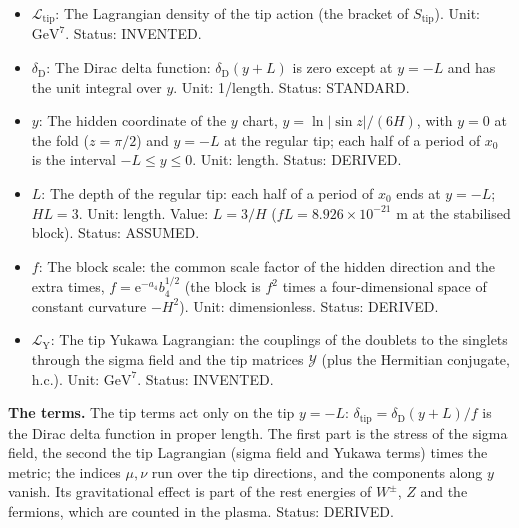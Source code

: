 \documentclass[
  10pt,
]{article}
\begin{document}
\begin{itemize}
  \(g_{MN}\,\mathrm{d}X^M\mathrm{d}X^N\) is the squared interval;
  \(g^{MN}\) is its inverse, \(g^M{}_N = \delta^M_N\), and
  \(\lvert g\rvert\) the absolute value of its determinant, so that
  \(\sqrt{\lvert g\rvert}\,\mathrm{d}^8X\) is the proper volume element.
  Unit: dimensionless. Status: AUTHOR.
\item
  \(\mathcal{L}_{\mathrm{tip}}\): The Lagrangian density of the tip
  action (the bracket of \(S_{\mathrm{tip}}\)). Unit:
  \(\mathrm{GeV}^{7}\). Status: INVENTED.
\item
  \(\delta_{\mathrm{D}}\): The Dirac delta function:
  \(\delta_{\mathrm{D}}(y + L)\) is zero except at \(y = -L\) and has
  the unit integral over \(y\). Unit: 1/length. Status: STANDARD.
\item
  \(y\): The hidden coordinate of the \(y\) chart,
  \(y = \ln\lvert\sin z\rvert/(6H)\), with \(y = 0\) at the fold
  (\(z = \pi/2\)) and \(y = -L\) at the regular tip; each half of a
  period of \(x_0\) is the interval \(-L \le y \le 0\). Unit: length.
  Status: DERIVED.
\item
  \(L\): The depth of the regular tip: each half of a period of \(x_0\)
  ends at \(y = -L\); \(HL = 3\). Unit: length. Value: \(L = 3/H\)
  (\(fL = 8.926\times10^{-21}\) m at the stabilised block). Status:
  ASSUMED.
\item
  \(f\): The block scale: the common scale factor of the hidden
  direction and the extra times, \(f = \mathrm{e}^{-a_4}b_4^{1/2}\) (the
  block is \(f^2\) times a four-dimensional space of constant curvature
  \(-H^2\)). Unit: dimensionless. Status: DERIVED.
\item
  \(\mathcal{L}_{\mathrm{Y}}\): The tip Yukawa Lagrangian: the couplings
  of the doublets to the singlets through the sigma field and the tip
  matrices \(\mathcal{Y}\) (plus the Hermitian conjugate, h.c.). Unit:
  \(\mathrm{GeV}^{7}\). Status: INVENTED.
\end{itemize}

\textbf{The terms.} The tip terms act only on the tip \(y = -L\):
\(\delta_{\mathrm{tip}} = \delta_{\mathrm{D}}(y + L)/f\) is the Dirac
delta function in proper length. The first part is the stress of the
sigma field, the second the tip Lagrangian (sigma field and Yukawa
terms) times the metric; the indices \(\mu, \nu\) run over the tip
directions, and the components along \(y\) vanish. Its gravitational
effect is part of the rest energies of \(W^\pm\), \(Z\) and the
fermions, which are counted in the plasma. Status: DERIVED.
\end{document}
